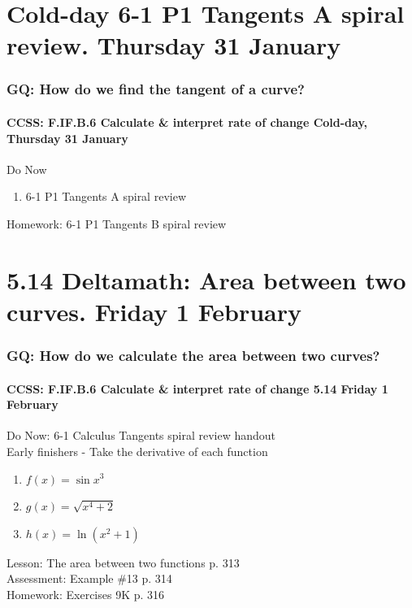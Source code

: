 \documentclass{beamer}
\begin{document}
\section{Cold-day 6-1 P1 Tangents A spiral review. Thursday 31 January}
  \frame
  {
    \frametitle{GQ: How do we find the tangent of a curve?}
    \framesubtitle{CCSS: F.IF.B.6 Calculate \& interpret rate of change \hfill \alert{Cold-day, Thursday 31  January}}

    \begin{block}{Do Now}
    \begin{enumerate}
        \item 6-1 P1 Tangents A spiral review
    \end{enumerate}
    \end{block}
    Homework: 6-1 P1 Tangents B spiral review
  }

\section{5.14 Deltamath: Area between two curves. Friday 1 February}
  \frame
  {
    \frametitle{GQ: How do we calculate the area between two curves?}
    \framesubtitle{CCSS: F.IF.B.6 Calculate \& interpret rate of change \hfill \alert{5.14 Friday 1 February}}

    \begin{block}{Do Now: 6-1 Calculus Tangents spiral review handout \\ Early finishers - Take the derivative of each function}
      \begin{enumerate}
      \item $f(x)=\sin{x^3}$
      \item $g(x)=\sqrt{x^4+2}$
      \item $h(x)=\ln{(x^2+1)}$
      \end{enumerate}
   \end{block}
    Lesson: The area between two functions p. 313\\%
    Assessment: Example \#13 p. 314 \\%
    Homework: Exercises 9K p. 316
  }
\end{document}

